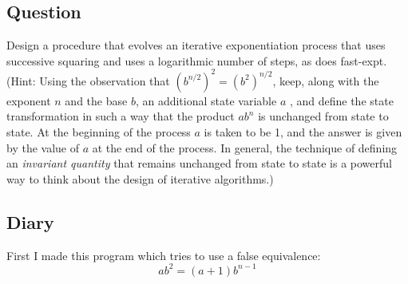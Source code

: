 \documentclass[
]{article}
\begin{document}
\hypertarget{question-14}{%
\subsection{Question}\label{question-14}}

Design a procedure that evolves an iterative exponentiation process that
uses successive squaring and uses a logarithmic number of steps, as does
fast-expt. (Hint: Using the observation that
\((b^{n/2})^2=(b^2)^{n/2}\), keep, along with the exponent \(n\) and the
base \(b\), an additional state variable \(a\) , and define the state
transformation in such a way that the product \({ab}^n\) is unchanged
from state to state. At the beginning of the process \(a\) is taken to
be 1, and the answer is given by the value of \(a\) at the end of the
process. In general, the technique of defining an \emph{invariant
quantity} that remains unchanged from state to state is a powerful way
to think about the design of iterative algorithms.)

\hypertarget{diary-2}{%
\subsection{Diary}\label{diary-2}}

First I made this program which tries to use a false equivalence:
\[ab^2 = (a + 1)b^{n - 1}\]
\end{document}
